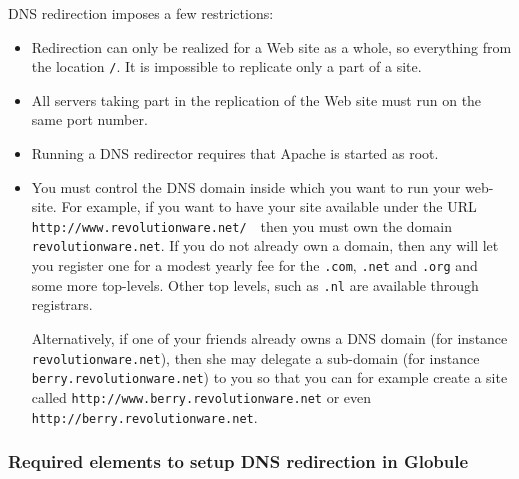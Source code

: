 \documentclass[10pt,a4paper]{article}
\makeatletter
\newenvironment{p}{\@open{P}{}}{\@close{P}}
\newenvironment{p}{}{\par}
\makeatother
\begin{document}
\begin{p}
DNS redirection imposes a few restrictions:

\begin{itemize}
\item Redirection can only be realized for a Web site as a whole, so
  everything from the location \verb!/!. It is impossible to replicate
  only a part of a site.
  
\item All servers taking part in the replication of the Web site must
  run on the same port number.
  
\item Running a DNS redirector requires that Apache is started as
  root.
  
\item You must control the DNS domain inside which you want to run your
  web-site.  For example, if you want to have your site available
  under the URL \verb!http://www.revolutionware.net/!~~then you must
  own the domain \verb!revolutionware.net!.  If you do not already own
  a domain, then any
   will
  let you register one for a modest yearly fee for the \verb!.com!,
  \verb!.net! and \verb!.org! and some more top-levels. Other top
  levels, such as \verb!.nl! are available through
  registrars.
  
  Alternatively, if one of your friends already owns a DNS domain
  (for instance \verb!revolutionware.net!), then she may delegate a sub-domain
  (for instance \verb!berry.revolutionware.net!) to you so that you can for
  example create a site called
  \verb!http://www.berry.revolutionware.net! or even \\
  \verb!http://berry.revolutionware.net!.
\end{itemize}
\end{p}

\subsubsection{Required elements to setup DNS redirection in Globule}
\end{document}
